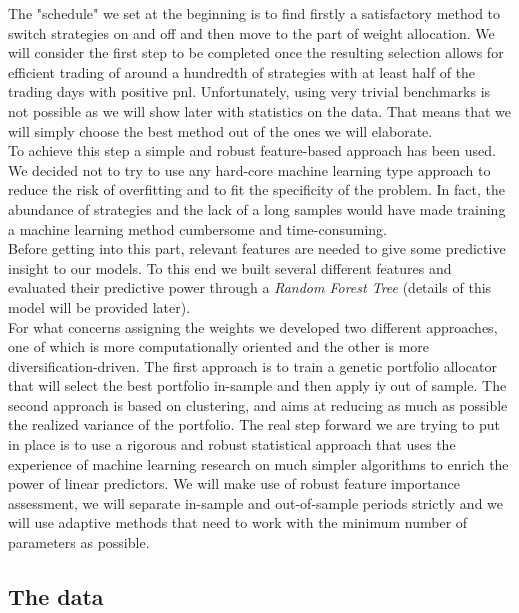 \documentclass[12pt]{article} %
\numberwithin{equation}{subsection}
\begin{document}
The "schedule" we set at the beginning is to find firstly a satisfactory method to switch strategies on and off and then move to the part of weight allocation. We will consider the first step to be completed once the resulting selection allows for efficient trading of around a hundredth of strategies with at least half of the trading days with positive pnl. Unfortunately, using very trivial benchmarks is not possible as we will show later with statistics on the data. That means that we will simply choose the best method out of the ones we will elaborate.\\
To achieve this step a simple and robust feature-based approach has been used. We decided not to try to use any hard-core machine learning type approach to reduce the risk of overfitting and to fit the specificity of the problem. In fact, the abundance of strategies and the lack of a long samples would have made training a machine learning method cumbersome and time-consuming.\\
Before getting into this part, relevant features are needed to give some predictive insight to our models. To this end we built several different features and evaluated their predictive power through a \textit{Random Forest Tree} (details of this model will be provided later).\\
For what concerns assigning the weights we developed two different approaches, one of which is more computationally oriented and the other is more diversification-driven. The first approach is to train a genetic portfolio allocator that will select the best portfolio in-sample and then apply iy out of sample. The second approach is based on clustering, and aims at reducing as much as possible the realized variance of the portfolio. The real step forward we are trying to put in place is to use a rigorous and robust statistical approach that uses the experience of machine learning research on much simpler algorithms to enrich the power of linear predictors. We will make use of robust feature importance assessment, we will separate in-sample and out-of-sample periods strictly and we will use adaptive methods that need to work with the minimum number of parameters as possible.\\


\subsection{The data}


\end{document}
